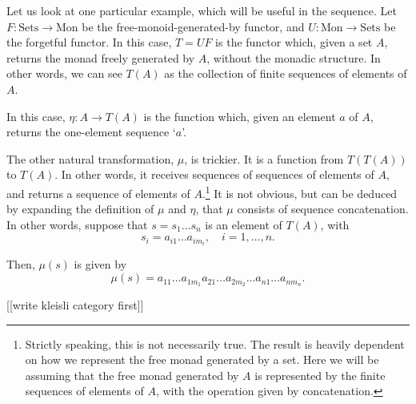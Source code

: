 \documentclass[11	pt]{article}
\theoremstyle{nonumberplain}
\newcommand{\cat}[1]{\mathrm{#1}}
\begin{document}
Let us look at one particular example, which will be useful in the sequence. Let $F \colon \cat{Sets} \to \cat{Mon}$ be the free-monoid-generated-by functor, and $U \colon \cat{Mon} \to \cat{Sets}$ be the forgetful functor. In this case, $T = UF$ is the functor which, given a set $A$, returns the monad freely generated by $A$, without the monadic structure. In other words, we can see $T(A)$ as the collection of finite sequences of elements of $A$.

In this case, $\eta \colon A \to T(A)$ is the function which, given an element $a$ of $A$, returns the one-element sequence `$a$'.

The other natural transformation, $\mu$, is trickier. It is a function from $T(T(A))$ to $T(A)$. In other words, it receives sequences of sequences of elements of $A$, and returns a sequence of elements of $A$.\footnote{Strictly speaking, this is not necessarily true. The result is heavily dependent on how we represent the free monad generated by a set. Here we will be assuming that the free monad generated by $A$ is represented by the finite sequences of elements of $A$, with the operation given by concatenation.} It is not obvious, but can be deduced by expanding the definition of $\mu$ and $\eta$, that $\mu$ consists of sequence concatenation. In other words, suppose that $s = s_1 \dots s_n$ is an element of $T(A)$, with
\begin{equation}
s_i = a_{i1} \dots a_{i m_i}, \quad i = 1, \dots, n.
\end{equation}

Then, $\mu(s)$ is given by
\begin{equation}
\mu(s) = a_{11} \dots a_{1 m_1} a_{21} \dots a_{2 m_2} \dots a_{n1} \dots a_{n m_n}.
\end{equation}

[[write kleisli category first]]



\end{document}
